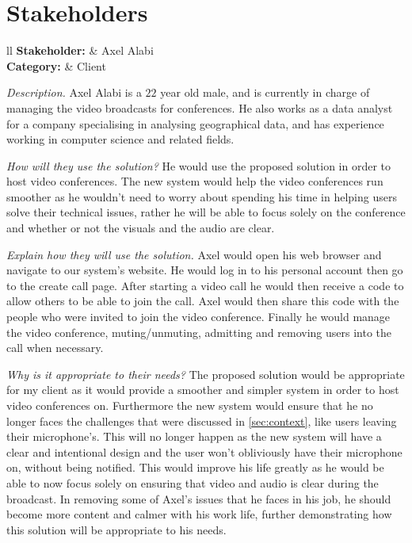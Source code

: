 \section{Stakeholders}
\label{sec:stakeholders}

\begin{tblr}{ll}
  \textsf{\bfseries Stakeholder: } & Axel Alabi\\
  \textsf{\bfseries Category: } & Client\\
\end{tblr}
\vspace{0.2cm}

\textit{Description.} %
Axel Alabi is a $22$ year old male, and is currently in charge
of managing the video broadcasts for conferences. He also
works as a data analyst for a company specialising in analysing
geographical data, and has experience working in computer
science and related fields. \vspace{0.2cm}

\textit{How will they use the solution?} %
He would use the proposed solution in order to host
video conferences. The new system would help the
video conferences run smoother as he wouldn't need to worry
about spending his time in helping users solve their technical
issues, rather he will be able to focus solely on the
conference and whether or not the visuals and the audio are
clear. \vspace{0.2cm}

\textit{Explain how they will use the solution.}
Axel would open his web browser and navigate to our system's
website. He would log in to his personal account then go to
the create call page. After starting a video call he would
then receive a code to allow others to be able to join the
call. Axel would then share this code with the people who
were invited to join the video conference. Finally he would
manage the video conference, muting/unmuting, admitting
and removing users into the call when necessary.
\vspace{0.2cm}

\textit{Why is it appropriate to their needs?} %
The proposed solution would be appropriate for my client as it
would provide a smoother and simpler system in order to host
video conferences on. Furthermore the new system would ensure
that he no longer faces the challenges that were discussed
in \ref{sec:context}, like users leaving their microphone's.
This will no longer happen as the new system will have a
clear and intentional design and the user won't obliviously
have their microphone on, without being notified. This would
improve his life greatly as he would be able to now focus
solely on ensuring that video and audio is clear during the
broadcast. In removing some of Axel's issues that he faces in
his job, he should become more content and calmer with his
work life, further demonstrating how this solution will be
appropriate to his needs.
\vspace{0.2cm}

